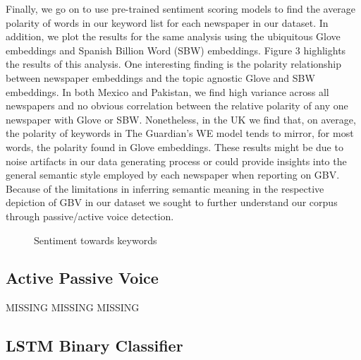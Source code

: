 \documentclass{article}
\begin{document}
{{Finally, we go on to use pre-trained sentiment scoring models to find the average polarity of words in our keyword list for each newspaper in our dataset. In addition, we plot the results for the same analysis using the ubiquitous Glove embeddings and Spanish Billion Word (SBW) embeddings. Figure 3 highlights the results of this analysis. One interesting finding is the polarity relationship between newspaper embeddings and the topic agnostic Glove and SBW embeddings. In both Mexico and Pakistan, we find high variance across all newspapers and no obvious correlation between the relative polarity of any one newspaper with Glove or SBW. Nonetheless, in the UK we find that, on average, the polarity of keywords in The Guardian’s WE model tends to mirror, for most words, the polarity found in Glove embeddings. These results might be due to noise artifacts in our data generating process or could provide insights into the general semantic style employed by each newspaper when reporting on GBV. Because of the limitations in inferring semantic meaning in the respective depiction of GBV in our dataset we sought to further understand our corpus through passive/active voice detection.

\begin{figure}[H]
	\caption{\label{fig:my-label1} Sentiment towards keywords}
\end{figure}

}


\subsection{Active Passive Voice}{


MISSING MISSING MISSING





}


\subsection{LSTM Binary Classifier}{


}}
\end{document}
